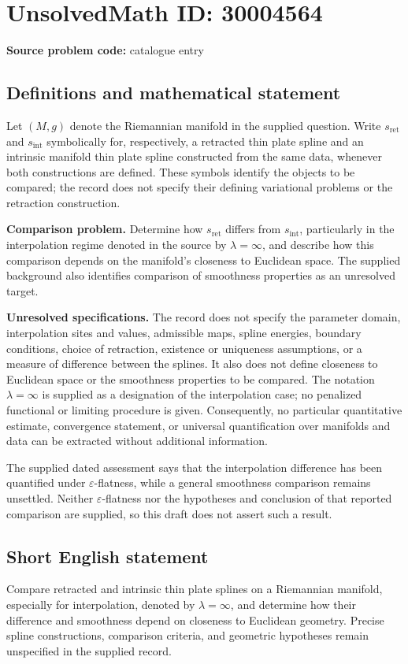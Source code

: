\documentclass[11pt]{article}
\begin{document}
\section*{UnsolvedMath ID: 30004564}
\textbf{Source problem code:} catalogue entry
\subsection{Definitions and mathematical statement}
Let \((M,g)\) denote the Riemannian manifold in the supplied question. Write \(s_{\mathrm{ret}}\) and \(s_{\mathrm{int}}\) symbolically for, respectively, a retracted thin plate spline and an intrinsic manifold thin plate spline constructed from the same data, whenever both constructions are defined. These symbols identify the objects to be compared; the record does not specify their defining variational problems or the retraction construction.

\textbf{Comparison problem.} Determine how \(s_{\mathrm{ret}}\) differs from \(s_{\mathrm{int}}\), particularly in the interpolation regime denoted in the source by \(\lambda=\infty\), and describe how this comparison depends on the manifold's closeness to Euclidean space. The supplied background also identifies comparison of smoothness properties as an unresolved target.

\textbf{Unresolved specifications.} The record does not specify the parameter domain, interpolation sites and values, admissible maps, spline energies, boundary conditions, choice of retraction, existence or uniqueness assumptions, or a measure of difference between the splines. It also does not define closeness to Euclidean space or the smoothness properties to be compared. The notation \(\lambda=\infty\) is supplied as a designation of the interpolation case; no penalized functional or limiting procedure is given. Consequently, no particular quantitative estimate, convergence statement, or universal quantification over manifolds and data can be extracted without additional information.

The supplied dated assessment says that the interpolation difference has been quantified under \(\varepsilon\)-flatness, while a general smoothness comparison remains unsettled. Neither \(\varepsilon\)-flatness nor the hypotheses and conclusion of that reported comparison are supplied, so this draft does not assert such a result.
\subsection{Short English statement}
Compare retracted and intrinsic thin plate splines on a Riemannian manifold, especially for interpolation, denoted by \(\lambda=\infty\), and determine how their difference and smoothness depend on closeness to Euclidean geometry. Precise spline constructions, comparison criteria, and geometric hypotheses remain unspecified in the supplied record.
\end{document}
